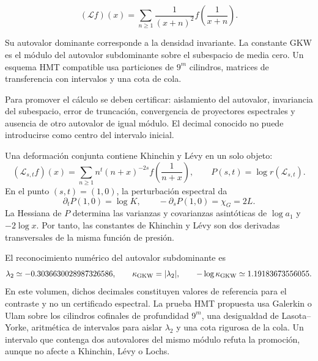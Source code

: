 \begin{equation}
(\mathcal L f)(x)=\sum_{n\ge1}\frac1{(x+n)^2}
f\!\left(\frac1{x+n}\right).
\label{eq:gkw-operator}
\end{equation}

Su autovalor dominante corresponde a la densidad invariante. La constante GKW es el m\'odulo del autovalor subdominante sobre el subespacio de media cero. Un esquema HMT compatible usa particiones de \(9^m\) cilindros, matrices de transferencia con intervalos y una cota de cola.

Para promover el c\'alculo se deben certificar: aislamiento del autovalor, invariancia del subespacio, error de truncaci\'on, convergencia de proyectores espectrales y ausencia de otro autovalor de igual m\'odulo. El decimal conocido no puede introducirse como centro del intervalo inicial.

Una deformaci\'on conjunta contiene Khinchin y L\'evy en un solo objeto:
\begin{equation}
(\mathcal L_{s,t}f)(x)
=\sum_{n\ge1}n^t(n+x)^{-2s}
 f\!\left(\frac1{n+x}\right),
\qquad
P(s,t)=\log r(\mathcal L_{s,t}).
\label{eq:gauss-pressure-operator}
\end{equation}
En el punto \((s,t)=(1,0)\), la perturbaci\'on espectral da
\begin{equation}
\partial_tP(1,0)=\log K,
\qquad
-\partial_sP(1,0)=\chi_G=2L.
\label{eq:pressure-derivatives}
\end{equation}
La Hessiana de \(P\) determina las varianzas y covarianzas asint\'oticas de
\(\log a_1\) y \(-2\log x\). Por tanto, las constantes de Khinchin y
L\'evy son dos derivadas transversales de la misma funci\'on de presi\'on.

El reconocimiento num\'erico del autovalor subdominante es
\[
\lambda_2\simeq-0.3036630028987326586,\qquad
\kappa_{\rm GKW}=|\lambda_2|,\qquad
-\log\kappa_{\rm GKW}\simeq1.19183673556055.
\]
En este volumen, dichos decimales constituyen valores de referencia para el
contraste y no un certificado espectral.
La prueba HMT propuesta usa Galerkin o Ulam sobre los cilindros cofinales de
profundidad \(9^m\), una desigualdad de Lasota--Yorke, aritm\'etica de
intervalos para aislar \(\lambda_2\) y una cota rigurosa de la cola. Un
intervalo que contenga dos autovalores del mismo m\'odulo refuta la
promoci\'on, aunque no afecte a Khinchin, L\'evy o Lochs.

